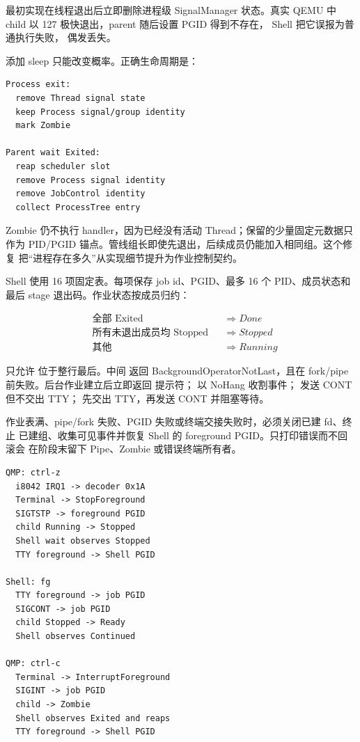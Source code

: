 最初实现在线程退出后立即删除进程级 SignalManager 状态。真实 QEMU 中
 child 以 127 极快退出，parent 随后设置 PGID 得到不存在，
Shell 把它误报为普通执行失败， 偶发丢失。

添加 sleep 只能改变概率。正确生命周期是：

\begin{lstlisting}
Process exit:
  remove Thread signal state
  keep Process signal/group identity
  mark Zombie

Parent wait Exited:
  reap scheduler slot
  remove Process signal identity
  remove JobControl identity
  collect ProcessTree entry
\end{lstlisting}

Zombie 仍不执行 handler，因为已经没有活动 Thread；保留的少量固定元数据只
作为 PID/PGID 锚点。管线组长即使先退出，后续成员仍能加入相同组。这个修复
把“进程存在多久”从实现细节提升为作业控制契约。

Shell 使用 16 项固定表。每项保存 job id、PGID、最多 16 个 PID、成员状态和
最后 stage 退出码。作业状态按成员归约：

\[
\begin{aligned}
  &\text{全部 Exited} &&\Rightarrow Done\\
  &\text{所有未退出成员均 Stopped} &&\Rightarrow Stopped\\
  &\text{其他} &&\Rightarrow Running
\end{aligned}
\]

 只允许 \code{\&} 位于整行最后。中间 \code{\&} 返回
BackgroundOperatorNotLast，且在 fork/pipe 前失败。后台作业建立后立即返回
提示符； 以 NoHang 收割事件； 发送 CONT 但不交出 TTY；
 先交出 TTY，再发送 CONT 并阻塞等待。

\begin{failurebox}
作业表满、pipe/fork 失败、PGID 失败或终端交接失败时，必须关闭已建 fd、终止
已建组、收集可见事件并恢复 Shell 的 foreground PGID。只打印错误而不回滚会
在阶段末留下 Pipe、Zombie 或错误终端所有者。
\end{failurebox}

\par
\begin{lstlisting}
QMP: ctrl-z
  i8042 IRQ1 -> decoder 0x1A
  Terminal -> StopForeground
  SIGTSTP -> foreground PGID
  child Running -> Stopped
  Shell wait observes Stopped
  TTY foreground -> Shell PGID

Shell: fg
  TTY foreground -> job PGID
  SIGCONT -> job PGID
  child Stopped -> Ready
  Shell observes Continued

QMP: ctrl-c
  Terminal -> InterruptForeground
  SIGINT -> job PGID
  child -> Zombie
  Shell observes Exited and reaps
  TTY foreground -> Shell PGID
\end{lstlisting}

